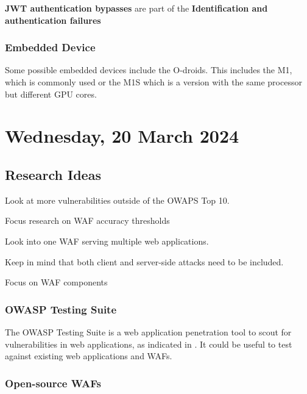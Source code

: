 \textbf{JWT authentication bypasses} are part of the \textbf{Identification and authentication failures}

\subsubsection{Embedded Device}

Some possible embedded devices include the O-droids. This includes the M1, which is commonly used or the M1S which is a version with the same processor but different GPU cores.

\pendsign

\section[2024/03/20]{Wednesday, 20 March 2024}

\subsection{Research Ideas}

\begin{compactitem}
    \item Look at more vulnerabilities outside of the OWAPS Top 10.
    \item Focus research on WAF accuracy thresholds
    \item Look into one WAF serving multiple web applications.
    \item Keep in mind that both client and server-side attacks need to be included.
    \item Focus on WAF components
\end{compactitem}


\subsubsection{OWASP Testing Suite}
The OWASP Testing Suite is a web application penetration tool to scout for vulnerabilities in web applications, as indicated in \cite{OWASPTESTSUITE}. It could be useful to test against existing web applications and WAFs.

\subsubsection{Open-source WAFs}

